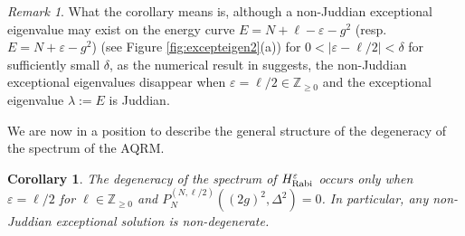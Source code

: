 \documentclass[11pt]{article}
\numberwithin{equation}{section}
\newcommand{\Z}{\mathbb{Z}} %
\newcommand{\e}{\varepsilon}
\newcommand{\HRabi}[1]{H_{\text{\upshape Rabi}}^{#1}} %
\theoremstyle{plain}
\newtheorem{cor}[thm]{Corollary}
\theoremstyle{definition}
\theoremstyle{remark}
\newtheorem{rem}{Remark}[section]
\begin{document}
\begin{rem}\label{no-non-Juddian}
  What the corollary means is, although a non-Juddian exceptional eigenvalue may exist on the energy curve
  $E=N+\ell -\e-g^2$ (resp. $E=N+\e-g^2$) (see Figure \ref{fig:excepteigen2}(a)) for $0<|\e-\ell/2|<\delta$ for sufficiently
  small $\delta$, as the numerical result in \cite{LB2016JPA} suggests, the non-Juddian exceptional eigenvalues
  disappear when $\e=\ell/2 \in \Z_{\geq0}$ and the exceptional eigenvalue $\lambda:=E$ is Juddian.
\end{rem}

We are now in a position to describe the general structure of the degeneracy of the spectrum of the AQRM.

\begin{cor}\label{DegenerateStructure}
  The degeneracy of the spectrum of $\HRabi{\e}$ occurs
  only when \(\e = \ell/2 \) for $\ell \in \Z_{\geq0}$ and $P_N^{(N,\ell/2)}((2g)^2,\Delta^2)=0$. In particular,
  any non-Juddian exceptional solution is non-degenerate.
\end{cor}
\end{document}
